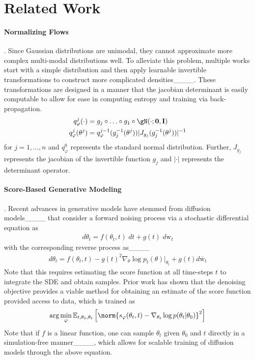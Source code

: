 \section{Related Work}
%
%
%
%
%
%
%

%

%

%
%
%
%
%

\paragraph{Normalizing Flows}. Since Gaussian distributions are unimodal, they cannot approximate more complex multi-modal distributions well. To alleviate this problem, multiple works start with a simple distribution and then apply learnable invertible transformations to construct more complicated densities____. These transformations are designed in a manner that the jacobian determinant is easily computable to allow for ease in computing entropy and training via back-propagation.
\begin{align}
    q^j_\varphi(\cdot) &= g_j \circ \ldots \circ g_1 \circ \gN(\cdot; \bf{0}, \bf{I}) \\
    q_\varphi^j(\theta^j) &= q^{j-1}_\varphi(g_j^{-1}(\theta^j)) |J_{g_j}(g_j^{-1}(\theta^j))|^{-1}
\end{align}
for $j = 1, \ldots, n$ and $q_\varphi^0$ represents the standard normal distribution. Further, $J_{g_j}$ represents the jacobian of the invertible function $g_j$ and $|\cdot|$ represents the determinant operator.

\paragraph{Score-Based Generative Modeling}. Recent advances in generative models have stemmed from diffusion models____ that consider a forward noising process via a stochastic differential equation as 
\begin{align}
    d\theta_t = f(\theta_t, t) \;dt + g(t)\;d\text{w}_t
\end{align}
with the corresponding reverse process as____
\begin{align}
    d\theta_t = f(\theta_t, t) - g(t)^2 \nabla_\theta \log p_t(\theta)|_{\theta_t} + g(t) d\bar{\text{w}}_t
\end{align}
Note that this requires estimating the score function at all time-steps $t$ to integrate the SDE and obtain samples. Prior work has shown that the denoising objective provides a viable method for obtaining an estimate of the score function provided access to data, which is trained as
\begin{align}
    \arg\min_\varphi \mathbb{E}_{t, \theta_0, \theta_t} \left[
    \norm{s_\varphi(\theta_t, t) - \nabla_{\theta_t} \log p(\theta_t | \theta_0)}^2\right]
\end{align}
Note that if $f$ is a linear function, one can sample $\theta_t$ given $\theta_0$ and $t$ directly in a simulation-free manner____, which allows for scalable training of diffusion models through the above equation.

